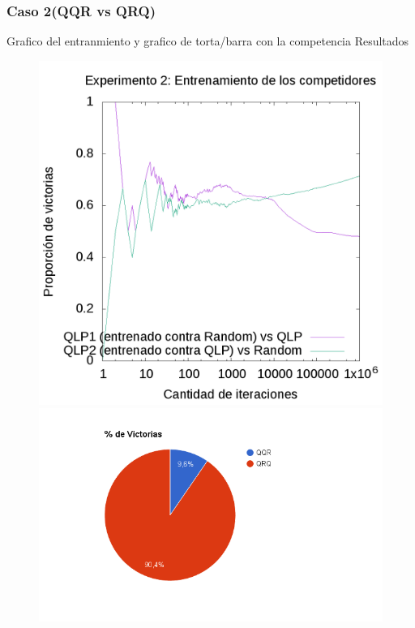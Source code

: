 \documentclass[10pt, a4paper]{article}
\begin{document}
\subsubsection{Caso 2(QQR vs QRQ)}

Grafico del entranmiento y grafico de torta/barra con la competencia Resultados

\begin{figure}[ht]
  \begin{minipage}[c]{1\textwidth}
  \includegraphics[scale=0.32]{E2train.png}
  \includegraphics[scale=0.4]{QQRvsQRQ.png}
  \end{minipage}
\end{figure}
\end{document}
